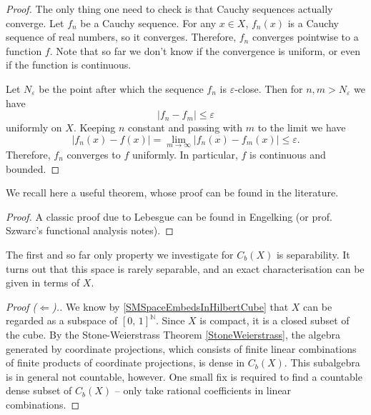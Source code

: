 \begin{proof}
The only thing one need to check is that Cauchy sequences actually converge. Let \( f_n \) be a Cauchy sequence. For any \( x \in X \), \( f_n(x) \) is a Cauchy sequence of real numbers, so it converges. Therefore, \( f_n \) converges pointwise to a function \( f \). Note that so far we don't know if the convergence is uniform, or even if the function is continuous.

Let \( N_{\varepsilon } \) be the point after which the sequence \( f_n \) is \(\varepsilon \)-close. Then for \( n, m > N_{\varepsilon } \) we have
\[ 
    \left| f_n - f_m \right| \leqslant \varepsilon
\]
uniformly on \( X \). Keeping \( n \) constant and passing with \( m \) to the limit we have
\[ 
    \left| f_n(x) - f(x) \right| = \lim_{m \to \infty} \left| f_n(x) - f_m(x) \right| \leqslant\varepsilon.
\]
Therefore, \( f_n  \) converges to \( f \) uniformly. In particular, \( f \) is continuous and bounded.
\end{proof}

We recall here a useful theorem, whose proof can be found in the literature.

\begin{proof}
A classic proof due to Lebesgue can be found in Engelking (or prof. Szwarc's functional analysis notes).
\end{proof}

The first and so far only property we investigate for \( C_b(X) \) is separability. It turns out that this space is rarely separable, and an exact characterisation can be given in terms of \( X \).


\begin{proof}[Proof (\(\Leftarrow\)).]
    We know by \ref{SMSpaceEmbedsInHilbertCube} that \( X \) can be regarded as a subspace of \( [0,\,1]^{ \mathbb{N} } \). Since \( X \) is compact, it is a closed subset of the cube. By the Stone-Weierstrass Theorem \ref{StoneWeierstrass}, the algebra generated by coordinate projections, which consists of finite linear combinations of finite products of coordinate projections, is dense in \( C_b(X). \)
    This subalgebra is in general not countable, however. One small fix is required to find a countable dense subset of \( C_b(X) \) -- only take rational coefficients in linear combinations.
\end{proof}

